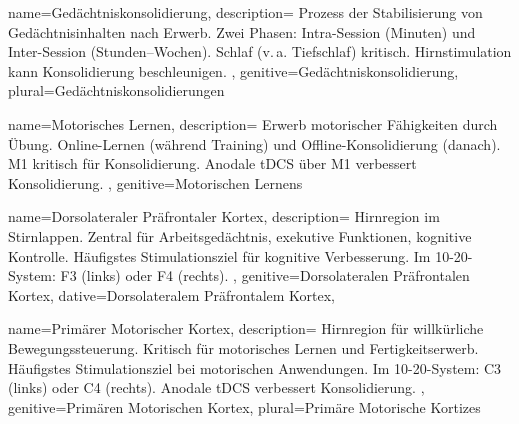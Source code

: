 {
	name=Gedächtniskonsolidierung,
	description={
			Prozess der Stabilisierung von Gedächtnisinhalten nach Erwerb. Zwei Phasen: Intra-Session (Minuten) und Inter-Session (Stunden--Wochen). Schlaf (v.\,a. Tiefschlaf) kritisch. Hirnstimulation kann Konsolidierung beschleunigen. \cite{reis_noninvasive_2009}\newline
		},
	genitive=Gedächtniskonsolidierung,
	plural=Gedächtniskonsolidierungen
}

{
	name=Motorisches Lernen,
	description={
			Erwerb motorischer Fähigkeiten durch Übung. Online-Lernen (während Training) und Offline-Konsolidierung (danach). \gls{M1} kritisch für Konsolidierung. Anodale \gls{tDCS} über M1 verbessert Konsolidierung. \cite{reis_noninvasive_2009}\newline
		},
	genitive=Motorischen Lernens
}


{
	name=Dorsolateraler Präfrontaler Kortex,
	description={
			Hirnregion im Stirnlappen. Zentral für Arbeitsgedächtnis, exekutive Funktionen, kognitive Kontrolle. Häufigstes Stimulationsziel für kognitive Verbesserung. Im 10-20-System: F3 (links) oder F4 (rechts). \cite{hoy_enhancement_2016, woods_technical_2016}\newline
		},
	genitive=Dorsolateralen Präfrontalen Kortex,
	dative=Dorsolateralem Präfrontalem Kortex,
}


{
	name=Primärer Motorischer Kortex,
	description={
			Hirnregion für willkürliche Bewegungssteuerung. Kritisch für motorisches Lernen und Fertigkeitserwerb. Häufigstes Stimulationsziel bei motorischen Anwendungen. Im 10-20-System: C3 (links) oder C4 (rechts). Anodale \gls{tDCS} verbessert Konsolidierung. \cite{reis_noninvasive_2009}\newline
		},
	genitive=Primären Motorischen Kortex,
	plural=Primäre Motorische Kortizes
}

\iffalse

